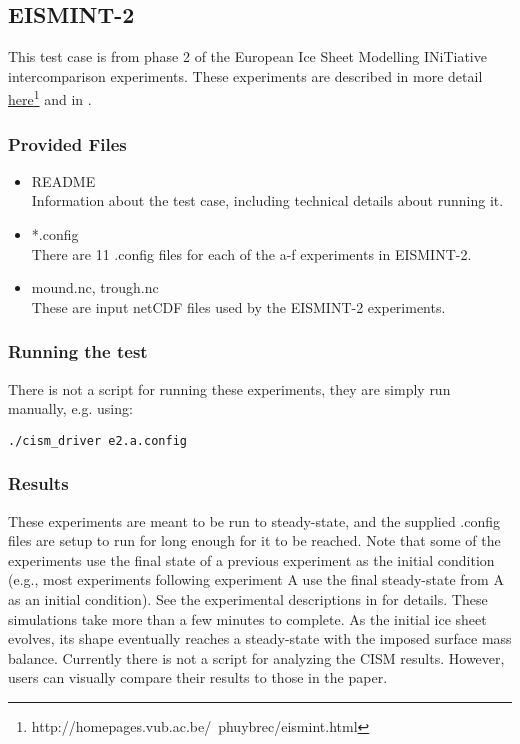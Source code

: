\subsection{EISMINT-2}
\label{sec:eismint2_description}
This test case is from phase 2 of the European Ice Sheet Modelling INiTiative intercomparison experiments.  These experiments are described in more detail
\href{http://homepages.vub.ac.be/~phuybrec/eismint.html}{here}\footnote{http://homepages.vub.ac.be/~phuybrec/eismint.html} and in \citet{Payne2000}.

\subsubsection{Provided Files}
\label{subsec:eismint2_files}

\begin{itemize}
	\item README \\
	Information about the test case, including technical details about running it.
  	\item *.config \\
  	There are 11 .config files for each of the a-f experiments in EISMINT-2.
  	\item mound.nc, trough.nc \\
    	These are input netCDF files used by the EISMINT-2 experiments.
\end{itemize}

\subsubsection{Running the test}
There is not a script for running these experiments, they are simply run manually, e.g. using: 

\texttt{./cism\_driver e2.a.config}


\subsubsection{Results}
\label{subsecc:eismint2_results}
These experiments are meant to be run to steady-state, and the supplied .config files are setup to run for long enough for it to be reached.  
Note that some of the experiments use the final state of a previous experiment 
as the initial condition (e.g., most experiments following experiment A use the final steady-state from A as an initial condition).  
See the experimental descriptions in \citet{Payne2000} for details.
These simulations take more than a few minutes to complete.
As the initial ice sheet evolves, its shape eventually reaches a steady-state with the imposed surface mass balance.  Currently there is not a script for analyzing the CISM results.  However, users can visually compare their results to those in the \citet{Payne2000} paper.


